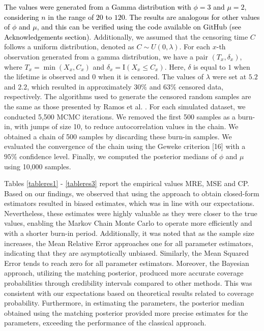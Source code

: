 \documentclass[]{interact}
\theoremstyle{plain}%
\theoremstyle{definition}
\theoremstyle{remark}
\begin{document}
\textcolor{black}{The values were generated from a Gamma distribution with $\phi=3$ and $\mu=2$, considering $n$ in the range of $20$ to $120$. The results are analogous for other values of $\phi$ and $\mu$, and this can be verified using the code available on GitHub (see Acknowledgements section)}. Additionally, we assumed that the censoring time $C$ follows a uniform distribution, denoted as $C \sim U(0,\lambda)$. For each $x$-th observation generated from a gamma distribution, we have a pair $(T_x, \delta_x)$, where $T_x = \min (X_x, C_x)$ and $\delta_x = \mathrm{I}(X_x \leq C_x)$. Here, $\delta$ is equal to $1$ when the lifetime is observed and $0$ when it is censored. The values of $\lambda$ were set at $5.2$ and $2.2$, which resulted in approximately $30\%$ and $63\%$ censored data, respectively. The algorithms used to generate the censored random samples are the same as those presented by Ramos et al. \cite{ramos2024sampling}. For each simulated dataset, we conducted 5,500 MCMC iterations. We removed the first 500 samples as a burn-in, with jumps of size 10, to reduce autocorrelation values in the chain. We obtained a chain of 500 samples by discarding these burn-in samples. We evaluated the convergence of the chain using the Geweke criterion [16] with a $95\%$ confidence level. Finally, we computed the posterior medians of $\phi$ and $\mu $ using 10,000 samples.


{\color{black}
Tables \ref{tableres1} - \ref{tableres3} report the empirical values MRE, MSE and CP. Based on our findings, we observed that using the approach to obtain closed-form estimators resulted in biased estimates, which was in line with our expectations. Nevertheless, these estimates were highly valuable as they were closer to the true values, enabling the Markov Chain Monte Carlo to operate more efficiently and with a shorter burn-in period. Additionally, it was noted that as the sample size increases, the Mean Relative Error approaches one for all parameter estimators, indicating that they are asymptotically unbiased. Similarly, the Mean Squared Error tends to reach zero for all parameter estimators.
}
Moreover, the Bayesian approach, utilizing the matching posterior, produced more accurate coverage probabilities through credibility intervals compared to other methods. This was consistent with our expectations based on theoretical results related to coverage probability. Furthermore, in estimating the parameters, the posterior median obtained using the matching posterior provided more precise estimates for the parameters, exceeding the performance of the classical approach.
\end{document}
